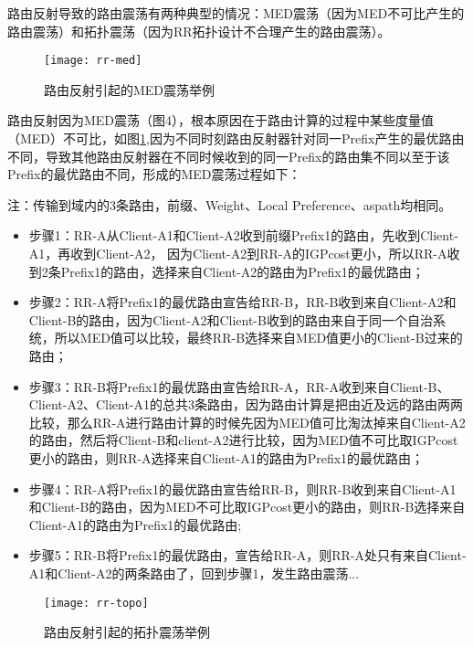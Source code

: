 路由反射导致的路由震荡有两种典型的情况：MED震荡（因为MED不可比产生的路由震荡）和拓扑震荡（因为RR拓扑设计不合理产生的路由震荡）。

\begin{figure}
  \centering
  \texttt{[image: rr-med]}
  \caption{路由反射引起的MED震荡举例\cite{Flavel2009Stable}}
  \label{fig:rr-med}
\end{figure}


路由反射因为MED震荡（图4），根本原因在于路由计算的过程中某些度量值（MED）不可比，如图\ref{fig:rr-med},因为不同时刻路由反射器针对同一Prefix产生的最优路由不同，导致其他路由反射器在不同时候收到的同一Prefix的路由集不同以至于该Prefix的最优路由不同，形成的MED震荡过程如下：

注：传输到域内的3条路由，前缀、Weight、Local Preference、aspath均相同。

\begin{itemize}
\item 步骤1：RR-A从Client-A1和Client-A2收到前缀Prefix1的路由，先收到Client-A1，再收到Client-A2， 因为Client-A2到RR-A的IGPcost更小，所以RR-A收到2条Prefix1的路由，选择来自Client-A2的路由为Prefix1的最优路由；
\item 步骤2：RR-A将Prefix1的最优路由宣告给RR-B，RR-B收到来自Client-A2和Client-B的路由，因为Client-A2和Client-B收到的路由来自于同一个自治系统，所以MED值可以比较，最终RR-B选择来自MED值更小的Client-B过来的路由；
\item 步骤3：RR-B将Prefix1的最优路由宣告给RR-A，RR-A收到来自Client-B、Client-A2、Client-A1的总共3条路由，因为路由计算是把由近及远的路由两两比较，那么RR-A进行路由计算的时候先因为MED值可比淘汰掉来自Client-A2的路由，然后将Client-B和client-A2进行比较，因为MED值不可比取IGPcost更小的路由，则RR-A选择来自Client-A1的路由为Prefix1的最优路由；
\item 步骤4：RR-A将Prefix1的最优路由宣告给RR-B，则RR-B收到来自Client-A1和Client-B的路由，因为MED不可比取IGPcost更小的路由，则RR-B选择来自Client-A1的路由为Prefix1的最优路由;
\item 步骤5：RR-B将Prefix1的最优路由，宣告给RR-A，则RR-A处只有来自Client-A1和Client-A2的两条路由了，回到步骤1，发生路由震荡...
\end{itemize}


\begin{figure}
  \centering
  \texttt{[image: rr-topo]}
  \caption{路由反射引起的拓扑震荡举例\cite{ibgp2016infocom}}
  \label{fig:rr-topo}
\end{figure}



